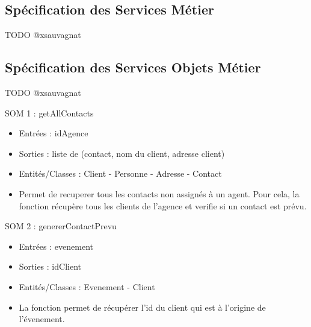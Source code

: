 \subsection{Spécification des Services Métier}

TODO @xsauvagnat

\subsection{Spécification des Services Objets Métier}

TODO @xsauvagnat

SOM 1 : getAllContacts
\begin{itemize}
\item Entrées : idAgence
\item Sorties : liste de (contact, nom du client, adresse client)
\item Entités/Classes : Client - Personne - Adresse - Contact
\item Permet de recuperer tous les contacts non assignés à un agent. Pour cela, la fonction récupère tous les clients de l'agence et verifie si un contact est prévu. 
\end{itemize}

SOM 2 : genererContactPrevu
\begin{itemize}
\item Entrées : evenement
\item Sorties : idClient
\item Entités/Classes : Evenement - Client
\item La fonction permet de récupérer l'id du client qui est à l'origine de l'évenement.
\end{itemize}
